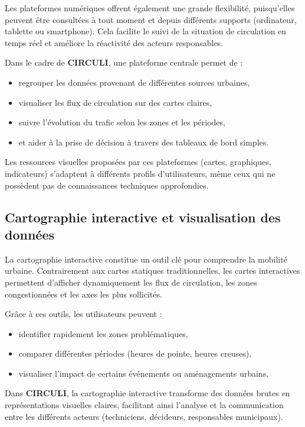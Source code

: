Les plateformes numériques offrent également une grande flexibilité, puisqu'elles peuvent être consultées à tout moment et depuis différents supports (ordinateur, tablette ou smartphone). Cela facilite le suivi de la situation de circulation en temps réel et améliore la réactivité des acteurs responsables.

Dans le cadre de \textbf{CIRCULI}, une plateforme centrale permet de :
\begin{itemize}
    \item regrouper les données provenant de différentes sources urbaines,
    \item visualiser les flux de circulation sur des cartes claires,
    \item suivre l'évolution du trafic selon les zones et les périodes,
    \item et aider à la prise de décision à travers des tableaux de bord simples.
\end{itemize}

Les ressources visuelles proposées par ces plateformes (cartes, graphiques, indicateurs) s'adaptent à différents profils d'utilisateurs, même ceux qui ne possèdent pas de connaissances techniques approfondies.

\subsection{Cartographie interactive et visualisation des données}
La cartographie interactive constitue un outil clé pour comprendre la mobilité urbaine. Contrairement aux cartes statiques traditionnelles, les cartes interactives permettent d'afficher dynamiquement les flux de circulation, les zones congestionnées et les axes les plus sollicités.

Grâce à ces outils, les utilisateurs peuvent :
\begin{itemize}
    \item identifier rapidement les zones problématiques,
    \item comparer différentes périodes (heures de pointe, heures creuses),
    \item visualiser l'impact de certains événements ou aménagements urbains.
\end{itemize}

Dans \textbf{CIRCULI}, la cartographie interactive transforme des données brutes en représentations visuelles claires, facilitant ainsi l'analyse et la communication entre les différents acteurs (techniciens, décideurs, responsables municipaux).

